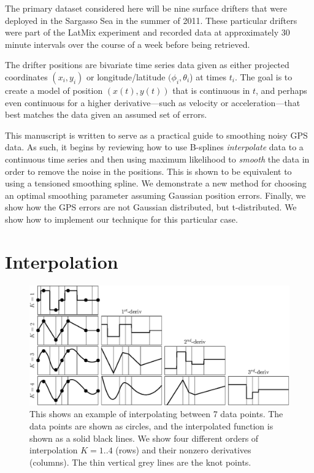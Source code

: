 \documentclass[twocol]{ametsoc}
\begin{document}
The primary dataset considered here will be nine surface drifters that were deployed in the Sargasso Sea in the summer of 2011. These particular drifters were part of the LatMix experiment \citep{shcherbina2015-bams} and recorded data at approximately 30 minute intervals over the course of a week before being retrieved.

The drifter positions are bivariate time series data given as either projected coordinates $(x_i, y_i)$ or longitude/latitude $(\phi_i, \theta_i$) at times $t_i$. The goal is to create a model of position $(x(t),y(t))$ that is continuous in $t$, and perhaps even continuous for a higher derivative---such as velocity or acceleration---that best matches the data given an assumed set of errors.

This manuscript is written to serve as a practical guide to smoothing noisy GPS data. As such, it begins by reviewing how to use B-splines \emph{interpolate} data to a continuous time series and then using maximum likelihood to \emph{smooth} the data in order to remove the noise in the positions. This is shown to be equivalent to using a tensioned smoothing spline. We demonstrate a new method for choosing an optimal smoothing parameter assuming Gaussian position errors. Finally, we show how the GPS errors are not Gaussian distributed, but t-distributed. We show how to implement our technique for this particular case.

%
\section{Interpolation}
%

\begin{figure}[t]
  \centerline{\includegraphics[width=39pc,angle=0]{interpolation}}
  
  \caption{This shows an example of interpolating between 7 data points. The data points are shown as circles, and the interpolated function is shown as a solid black lines. We show four different orders of interpolation $K=1..4$ (rows) and their nonzero derivatives (columns). The thin vertical grey lines are the knot points.}
  \label{interpolation}
\end{figure}
\end{document}
